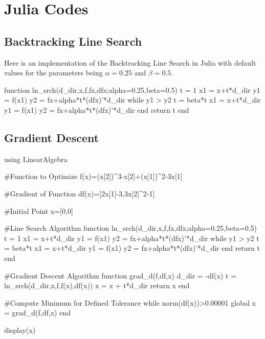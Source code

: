 
\chapter{Julia Codes}

\section{Backtracking Line Search}
Here is an implementation of the Backtracking Line Search in Julia with default values for the parameters being $\alpha=0.25$ and $\beta=0.5$.
\begin{jllisting}
	function ln_srch(d_dir,x,f,fx,dfx;alpha=0.25,beta=0.5)
		t = 1
		x1 = x+t*d_dir
		y1 = f(x1)
		y2 = fx+alpha*t*(dfx)'*d_dir
		while y1 > y2
			t = beta*t
			x1 = x+t*d_dir
			y1 = f(x1)
			y2 = fx+alpha*t*(dfx)'*d_dir
		end
		return t
	end
\end{jllisting}

\section{Gradient Descent}
\begin{jllisting}
	using LinearAlgebra
	
	#Function to Optimize
	f(x)=(x[2])^3-x[2]+(x[1])^2-3x[1]
	
	#Gradient of Function
	df(x)=[2x[1]-3,3x[2]^2-1]
	
	#Initial Point
	x=[0,0]
	
	#Line Search Algorithm
	function ln_srch(d_dir,x,f,fx,dfx;alpha=0.25,beta=0.5)
		t = 1
		x1 = x+t*d_dir
		y1 = f(x1)
		y2 = fx+alpha*t*(dfx)'*d_dir
		while y1 > y2
			t = beta*t
			x1 = x+t*d_dir
			y1 = f(x1)
			y2 = fx+alpha*t*(dfx)'*d_dir
		end
		return t
	end
	
	#Gradient Descent Algorithm
	function grad_d(f,df,x)
		d_dir = -df(x)
		t = ln_srch(d_dir,x,f,f(x),df(x))
		x = x + t*d_dir
		return x
	end
	
	#Compute Minimum for Defined Tolerance
	while norm(df(x))>0.00001
		global x = grad_d(f,df,x)
	end
	
	display(x)

	
\end{jllisting}

